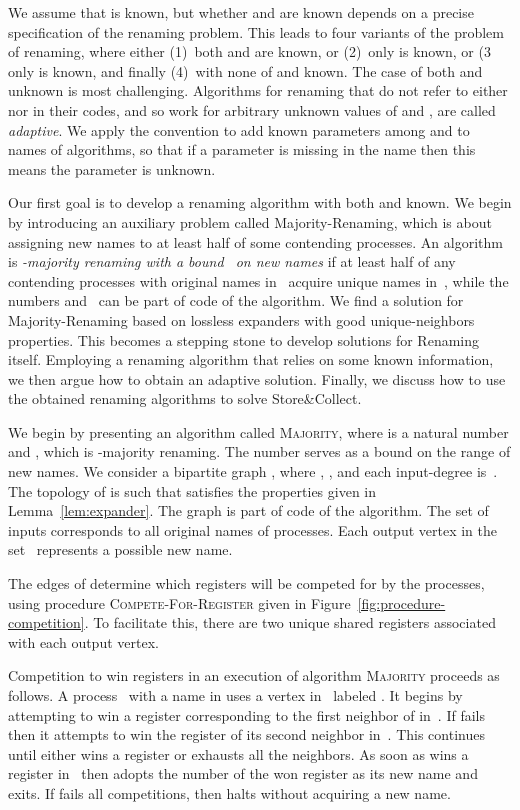 \documentclass[11pt]{article}
\begin{document}
We assume that  is known, but whether  and  are known depends on a precise specification of the renaming problem.
This leads to four variants of the problem of renaming, where either (1)~both  and  are known, or (2)~only  is known, or (3~ only  is known, and finally (4)~with none of  and  known.
The case of both  and  unknown is most challenging.
Algorithms for renaming that do not refer to either  nor  in their codes, and so work for arbitrary unknown values of  and , are called \emph{adaptive}.
We apply the convention to add known parameters among  and  to names of algorithms, so that if a parameter  is missing in the name then this means the parameter is unknown.


Our first goal is to develop a renaming algorithm with both  and  known.
We begin by introducing an auxiliary problem called Majority-Renaming, which is about assigning new names to at least half of some  contending processes.
An algorithm is \emph{-majority renaming with a bound~ on new names} if at least half of any  contending processes with original names in~ acquire unique names in~, while the numbers  and~ can be part of code of the algorithm.
We find a solution for Majority-Renaming based on lossless expanders with good unique-neighbors properties.
This becomes a stepping stone to develop solutions for Renaming itself.
Employing a renaming algorithm that relies on some known information, we then argue how to obtain an adaptive solution.
Finally, we discuss how to use the obtained renaming algorithms to solve Store\&Collect.

We begin by presenting an algorithm called \textsc{Majority}, where  is a natural number and , which is -majority renaming.
The number  serves as a bound on the range of new names.
We consider a bipartite graph , where , , and each input-degree is~.
The topology of  is such that  satisfies the properties given in Lemma~\ref{lem:expander}.
The graph  is part of code of the algorithm.
The set  of inputs corresponds to all  original names of processes.
Each output vertex in the set~ represents a possible new name. 

The edges of  determine which registers will be competed for by the processes, using procedure \textsc{Compete-For-Register} given in Figure~\ref{fig:procedure-competition}.
To facilitate this, there are two unique shared registers associated with each output vertex.

Competition to win registers in an execution of algorithm \textsc{Majority} proceeds as follows.
A process~ with a name in  uses a vertex  in~ labeled .
It begins by attempting to win a register corresponding to the first neighbor of  in~.
If  fails then it attempts to win the register of its second neighbor in~.
This continues until  either wins a register or exhausts all the neighbors. 
As soon as  wins a register in~ then  adopts the number of the won register as its new name and exits.
If  fails all  competitions, then  halts without acquiring a new name.
\end{document}
